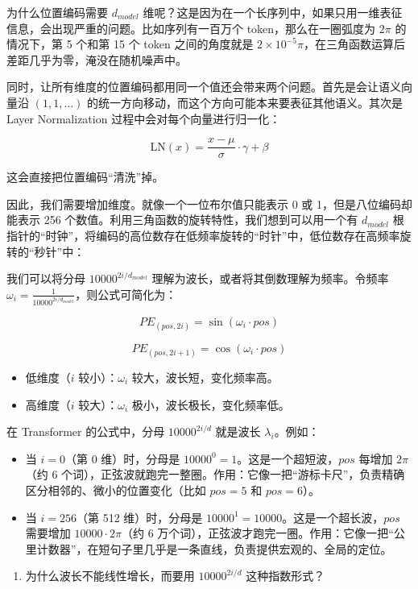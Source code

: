 为什么位置编码需要 \(d_{model}\) 维呢？这是因为在一个长序列中，如果只用一维表征信息，会出现严重的问题。比如序列有一百万个 token，那么在一圈弧度为 \(2\pi\) 的情况下，第 5 个和第 15 个 token 之间的角度就是 \(2 \times 10^{-5}\pi\)，在三角函数运算后差距几乎为零，淹没在随机噪声中。

同时，让所有维度的位置编码都用同一个值还会带来两个问题。首先是会让语义向量沿 \((1,1,\ldots)\) 的统一方向移动，而这个方向可能本来要表征其他语义。其次是 Layer Normalization 过程中会对每个向量进行归一化：

\[
\mathrm{LN}(x)=\frac{x-\mu}{\sigma}\cdot\gamma+\beta
\]

这会直接把位置编码``清洗''掉。

因此，我们需要增加维度。就像一个一位布尔值只能表示 0 或 1，但是八位编码却能表示 256 个数值。利用三角函数的旋转特性，我们想到可以用一个有 \(d_{model}\) 根指针的``时钟''，将编码的高位数存在低频率旋转的``时针''中，低位数存在高频率旋转的``秒针''中：

我们可以将分母 \(10000^{2i/d_{model}}\) 理解为波长，或者将其倒数理解为频率。令频率 \(\omega_i=\frac{1}{10000^{2i/d_{model}}}\)，则公式可简化为：

\[
PE_{(pos,2i)}=\sin(\omega_i\cdot pos)
\]

\[
PE_{(pos,2i+1)}=\cos(\omega_i\cdot pos)
\]

\begin{itemize}
\tightlist
\item
  低维度（\(i\) 较小）：\(\omega_i\) 较大，波长短，变化频率高。
\item
  高维度（\(i\) 较大）：\(\omega_i\) 极小，波长极长，变化频率低。
\end{itemize}

在 Transformer 的公式中，分母 \(10000^{2i/d}\) 就是波长 \(\lambda_i\)。例如：

\begin{itemize}
\tightlist
\item
  当 \(i=0\)（第 0 维）时，分母是 \(10000^0=1\)。这是一个超短波，\(pos\) 每增加 \(2\pi\)（约 6 个词），正弦波就跑完一整圈。作用：它像一把``游标卡尺''，负责精确区分相邻的、微小的位置变化（比如 \(pos=5\) 和 \(pos=6\)）。
\item
  当 \(i=256\)（第 512 维）时，分母是 \(10000^1=10000\)。这是一个超长波，\(pos\) 需要增加 \(10000\cdot2\pi\)（约 6 万个词），正弦波才跑完一圈。作用：它像一把``公里计数器''，在短句子里几乎是一条直线，负责提供宏观的、全局的定位。
\end{itemize}

\begin{enumerate}
\def\labelenumi{\arabic{enumi}.}
\setcounter{enumi}{2}
\tightlist
\item
  为什么波长不能线性增长，而要用 \(10000^{2i/d}\) 这种指数形式？
\end{enumerate}

